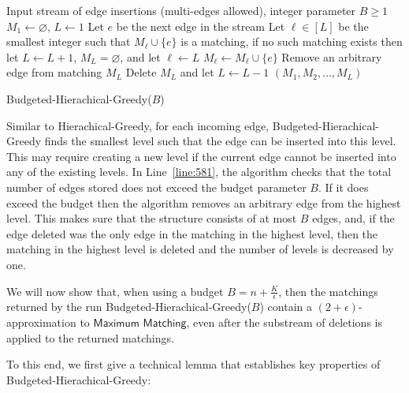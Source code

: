 \documentclass[11pt,a4paper]{article}
\begin{document}
\begin{algorithm}
    \begin{algorithmic}[1]
        \REQUIRE Input stream of edge insertions (multi-edges allowed), integer parameter $B \ge 1$
        \STATE $M_1 \gets \varnothing$, $L \gets 1$
            \STATE Let $e$ be the next edge in the stream
            \STATE Let $\ell \in [L]$ be the smallest integer such that $M_{\ell} \cup \{e\}$ is a matching, if no such matching exists then let $L \gets L+1$, $M_L = \varnothing$, and let $\ell \gets L$
            \STATE $M_{\ell} \gets M_{\ell} \cup \{e\}$
             \label{line:581}
                \STATE Remove an arbitrary edge from matching $M_L$
                    \STATE Delete $M_L$ and let $L \gets L - 1$
                \ENDIF
            \ENDIF
        \ENDWHILE
        \RETURN $(M_1, M_2, \dots, M_{L})$
    \end{algorithmic}
    \caption{\textsf{Budgeted-Hierachical-Greedy($B$)}  \label{alg:budgeted-hierachical-matching}}
\end{algorithm}

Similar to \textsf{Hierachical-Greedy}, for each incoming edge, \textsf{Budgeted-Hierachical-Greedy} finds the smallest level such that the edge can be inserted into this level. This may require creating a new level if the current edge cannot be inserted into any of the existing levels. In Line~\ref{line:581}, the algorithm checks that the total number of edges stored does not exceed the budget parameter $B$. If it does exceed the budget then the algorithm removes an arbitrary edge from the highest level. This makes sure that the structure consists of at most $B$ edges, and, if the edge deleted was the only edge in the matching in the highest level, then the matching in the highest level is deleted and the number of levels is decreased by one.

We will now show that, when using a budget $B = n + \frac{K}{\epsilon}$, then the matchings returned by the run \textsf{Budgeted-Hierachical-Greedy($B$)} contain a $(2+\epsilon)$-approximation to $\textsf{Maximum Matching}$, even after the substream of deletions is applied to the returned matchings.

To this end, we first give a technical lemma that establishes key  properties of \textsf{Budgeted-Hierachical-Greedy}:
\end{document}
